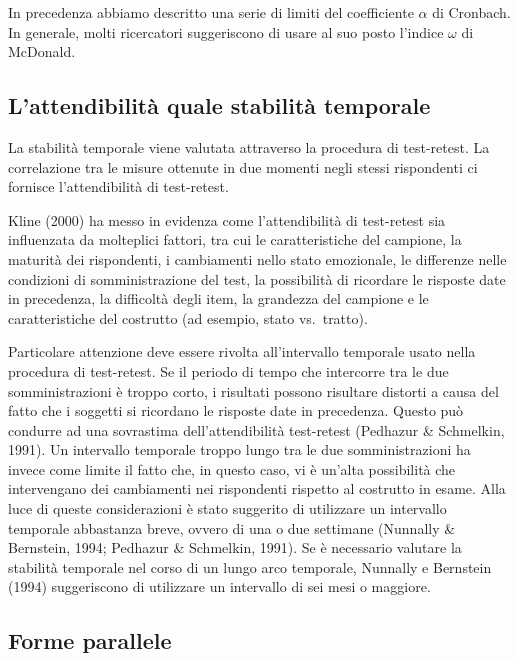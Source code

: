 \documentclass[
  11pt,
]{krantz}
\theoremstyle{definition}
\theoremstyle{definition}
\theoremstyle{definition}
\theoremstyle{definition}
\theoremstyle{remark}
\begin{document}
In precedenza abbiamo descritto una serie di limiti del coefficiente \(\alpha\) di Cronbach. In generale, molti ricercatori suggeriscono di usare al suo posto l'indice \(\omega\) di McDonald.

\hypertarget{lattendibilituxe0-quale-stabilituxe0-temporale}{%
\subsection{L'attendibilità quale stabilità temporale}\label{lattendibilituxe0-quale-stabilituxe0-temporale}}

La stabilità temporale viene valutata attraverso la procedura di test-retest. La correlazione tra le misure ottenute in due momenti negli stessi rispondenti ci fornisce l'attendibilità di test-retest.

Kline (2000) ha messo in evidenza come l'attendibilità di test-retest sia influenzata da molteplici fattori, tra cui le caratteristiche del campione, la maturità dei rispondenti, i cambiamenti nello stato emozionale, le differenze nelle condizioni di somministrazione del test, la possibilità di ricordare le risposte date in precedenza, la difficoltà degli item, la grandezza del campione e le caratteristiche del costrutto (ad esempio, stato vs.~tratto).

Particolare attenzione deve essere rivolta all'intervallo temporale usato nella procedura di test-retest. Se il periodo di tempo che intercorre tra le due somministrazioni è troppo corto, i risultati possono risultare distorti a causa del fatto che i soggetti si ricordano le risposte date in precedenza. Questo può condurre ad una sovrastima dell'attendibilità test-retest (Pedhazur \& Schmelkin, 1991). Un intervallo temporale troppo lungo tra le due somministrazioni ha invece come limite il fatto che, in questo caso, vi è un'alta possibilità che intervengano dei cambiamenti nei rispondenti rispetto al costrutto in esame. Alla luce di queste considerazioni è stato suggerito di utilizzare un intervallo temporale abbastanza breve, ovvero di una o due settimane (Nunnally \& Bernstein, 1994; Pedhazur \& Schmelkin, 1991). Se è necessario valutare la stabilità temporale nel corso di un lungo arco temporale, Nunnally e Bernstein (1994) suggeriscono di utilizzare un intervallo di sei mesi o maggiore.

\hypertarget{forme-parallele}{%
\subsection{Forme parallele}\label{forme-parallele}}
\end{document}
